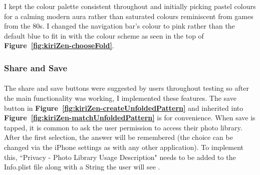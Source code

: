 \documentclass[11pt]{article}
\begin{document}
            I kept the colour palette consistent throughout and initially picking pastel colours for a calming modern  aura rather than saturated colours reminiscent from games from the 80s. I changed the navigation bar's colour to pink rather than the default blue to fit in with the colour scheme as seen in the top of \textbf{Figure~\ref{fig:kiriZen-chooseFold}}.
            
            
             \subsubsection{Share and Save}
                \paragraph{}
                
                The share and save buttons were suggested by users throughout testing so after the main functionality was working, I implemented these features. The save button in \textbf{Figure~\ref{fig:kiriZen-createUnfoldedPattern}} and inherited into \textbf{Figure~\ref{fig:kiriZen-matchUnfoldedPattern}} is for convenience. When save is tapped, it is common to ask the user permission to access their photo library. After the first selection, the answer will be remembered (the choice can be changed via the iPhone settings as with any other application). To implement this, ``Privacy - Photo Library Usage Description" needs to be added to the Info.plist file along with a String the user will see \cite{pList}.
                
\end{document}
